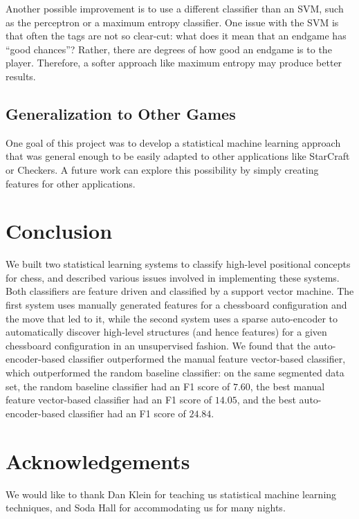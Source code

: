 \documentclass[11pt]{article}
\begin{document}
Another possible improvement is to use a different classifier than an SVM, such as the perceptron or a maximum entropy classifier. One issue with the SVM is that often the tags are not so clear-cut: what does it mean that an endgame has “good chances”? Rather, there are degrees of how good an endgame is to the player. Therefore, a softer approach like maximum entropy may produce better results.

\subsection{Generalization to Other Games}
One goal of this project was to develop a statistical machine learning approach that was general enough to be easily adapted to other applications like StarCraft or Checkers. A future work can explore this possibility by simply creating features for other applications.

\section{Conclusion}
We built two statistical learning systems to classify high-level positional concepts for chess, and described various issues involved in implementing these systems. Both classifiers are feature driven and classified by a support vector machine. The first system uses manually generated features for a chessboard configuration and the move that led to it, while the second system uses a sparse auto-encoder to automatically discover high-level structures (and hence features) for a given chessboard configuration in an unsupervised fashion. We found that the auto-encoder-based classifier outperformed the manual feature vector-based classifier, which outperformed the random baseline classifier: on the same segmented data set, the random baseline classifier had an F1 score of $\mathbf{7.60}$, the best manual feature vector-based classifier had an F1 score of $\mathbf{14.05}$, and the best auto-encoder-based classifier had an F1 score of $\mathbf{24.84}$.

\section{Acknowledgements}
We would like to thank Dan Klein for teaching us statistical machine learning techniques, and Soda Hall for accommodating us for many nights.



\end{document}
